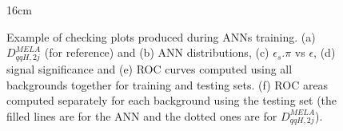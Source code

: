 \begin{figure}[hbtp]{16cm}
	\caption{Example of checking plots produced during ANNs training. (a) $D_{qqH, 2j}^{MELA}$ (for reference) and (b) ANN distributions, (c) $\epsilon_{s}.\pi$ vs $\epsilon$, (d) signal significance and (e) ROC curves computed using all backgrounds together for training and testing sets. (f) ROC areas computed separately for each background using the testing set (the filled lines are for the ANN and the dotted ones are for $D_{qqH, 2j}^{MELA}$).}
	\centering		
\end{figure}
